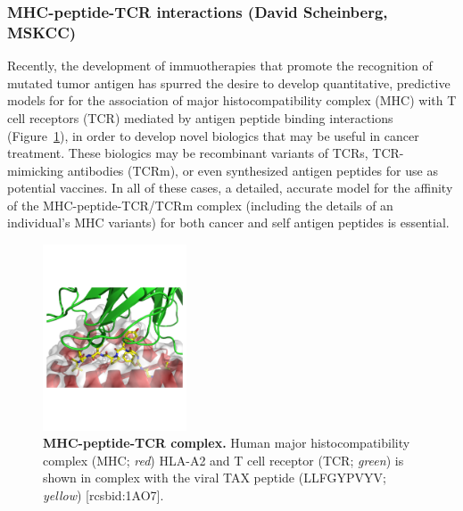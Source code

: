 \documentclass[10pt]{article}
\begin{document}
\vspace{-0.5cm}
\subsubsection*{MHC-peptide-TCR interactions (David Scheinberg, MSKCC)}
\vspace{-0.3cm}

Recently, the development of immuotherapies that promote the recognition of mutated tumor antigen has spurred the desire to develop quantitative, predictive models for for the association of major histocompatibility complex (MHC) with T cell receptors (TCR) mediated by antigen peptide binding interactions (Figure~\ref{figure:mhc-peptide-tcr}), in order to develop novel biologics that may be useful in cancer treatment.
These biologics may be recombinant variants of TCRs, TCR-mimicking antibodies (TCRm), or even synthesized antigen peptides for use as potential vaccines.
In all of these cases, a detailed, accurate model for the affinity of the MHC-peptide-TCR/TCRm complex (including the details of an individual's MHC variants) for both cancer and self antigen peptides is essential.

\begin{figure}
\vspace{-2.0cm}
\includegraphics[width=0.38\textwidth]{figures/1AO7.pdf}
\vspace{-2.5cm}
\caption{\footnotesize \label{figure:mhc-peptide-tcr} {\bf MHC-peptide-TCR complex.}
Human major histocompatibility complex (MHC; \emph{red}) HLA-A2 and T cell receptor (TCR; \emph{green}) is shown in complex with the viral TAX peptide (LLFGYPVYV; \emph{yellow}) [rcsbid:1AO7].}
\end{figure}
\end{document}
